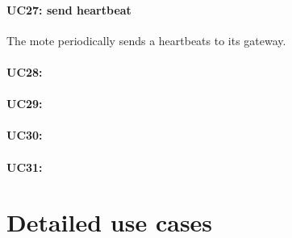 \paragraph{UC27: send heartbeat}
The mote  periodically sends a heartbeats to its gateway.
\paragraph{UC28: }
\paragraph{UC29: }
\paragraph{UC30: }
\paragraph{UC31: }

\section{Detailed use cases}

